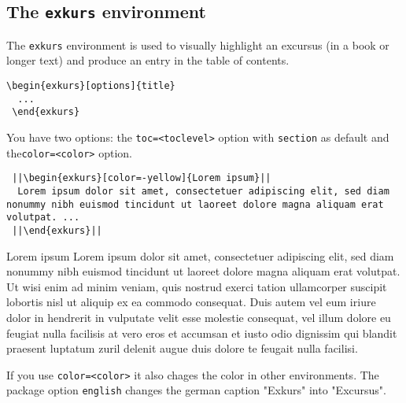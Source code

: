 \documentclass[DIV10]{scrartcl}
\begin{document}
\subsection{The \texttt{exkurs} environment}
The \verb=exkurs= environment is used to visually highlight an excursus (in a book or longer text) and produce an entry in the table of contents.
\begin{lstlisting}[numbers=none,basicstyle=\normalsize\ttfamily]
 \begin{exkurs}[options]{title}
  ...
 \end{exkurs}
\end{lstlisting}
You have two options: the \verb+toc=<toclevel>+ option with \verb=section= as default and the\linebreak\verb+color=<color>+ option.
\begin{lstlisting}
 ||\begin{exkurs}[color=-yellow]{Lorem ipsum}||
  Lorem ipsum dolor sit amet, consectetuer adipiscing elit, sed diam nonummy nibh euismod tincidunt ut laoreet dolore magna aliquam erat volutpat. ...
 ||\end{exkurs}||
\end{lstlisting}
\begin{exkurs}[color=-yellow,toc=paragraph]{Lorem ipsum}
 Lorem ipsum dolor sit amet, consectetuer adipiscing elit, sed diam nonummy nibh euismod tincidunt ut laoreet dolore magna aliquam erat volutpat. Ut wisi enim ad minim veniam, quis nostrud exerci tation ullamcorper suscipit lobortis nisl ut aliquip ex ea commodo consequat. Duis autem vel eum iriure dolor in hendrerit in vulputate velit esse molestie consequat, vel illum dolore eu feugiat nulla facilisis at vero eros et accumsan et iusto odio dignissim qui blandit praesent luptatum zuril delenit augue duis dolore te feugait nulla facilisi.
\end{exkurs}
If you use \verb+color=<color>+ it also chages the color in other environments. The package option \verb=english= changes the german caption "Exkurs" into "Excursus".
\end{document}
